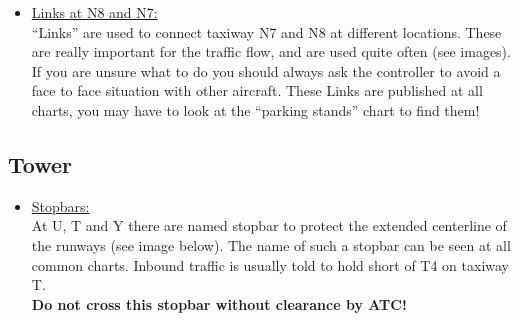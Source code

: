\begin{itemize}
  \item \underline{Links at N8 and N7:}\\ 
    “Links” are used to connect taxiway N7 and N8 at different locations. 
    These are really important for the traffic flow, and are used quite often (see images). 
    If you are unsure what to do you should always ask the controller to avoid a face to face situation with other aircraft. 
    These Links are published at all charts, you may have to look at the “parking stands” chart to find them!
    

\end{itemize}

\subsection[tower]{Tower}

\begin{itemize}
  \item \underline{Stopbars:}\\ 
    At U, T and Y there are named stopbar to protect the extended centerline of the runways (see image below). 
    The name of such a stopbar can be seen at all common charts. 
    Inbound traffic is usually told to hold short of T4 on taxiway T.\\ 
    \textbf{Do not cross this stopbar without clearance by ATC!}
    
    
\end{itemize}
